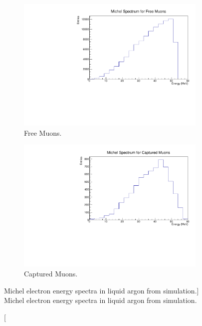 \begin{figure}

	\centering
	\centering
	\begin{subfigure}[b]{0.7\textwidth}
		\centering
		\includegraphics[width=\textwidth]{figures/michel_spec_free.pdf}
		\caption {Free Muons.}
		\label{fig:michel_spec_free}
	\end{subfigure}
	\begin{subfigure}[b]{0.7\textwidth}
		\centering
		\includegraphics[width=\textwidth]{figures/michel_spec_cap.pdf}
		\caption {Captured Muons.}
		\label{fig:michel_spec_cap}
	\end{subfigure}

	\caption
	[Michel electron energy spectra in liquid argon from \protodune{} simulation.]
	{Michel electron energy spectra in liquid argon from \protodune{} simulation.}

	\label{fig:michel_spec}

\end{figure}

